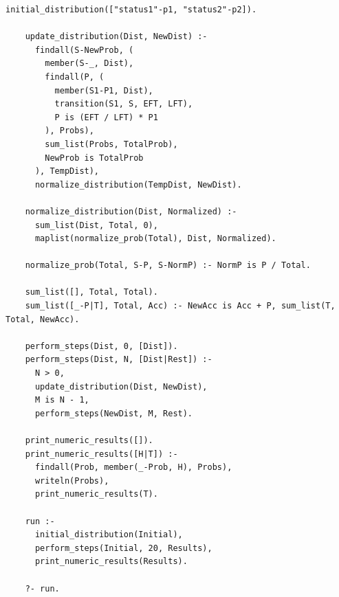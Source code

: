 \begin{lstlisting}[label=code:prog2, caption={Реализация построения вероятностного распределения}]
	initial_distribution(["status1"-p1, "status2"-p2]).
	
	update_distribution(Dist, NewDist) :-
	  findall(S-NewProb, (
	    member(S-_, Dist),
	    findall(P, (
	      member(S1-P1, Dist),
	      transition(S1, S, EFT, LFT),
	      P is (EFT / LFT) * P1
	    ), Probs),
	    sum_list(Probs, TotalProb),
	    NewProb is TotalProb
	  ), TempDist),
	  normalize_distribution(TempDist, NewDist).
	
	normalize_distribution(Dist, Normalized) :-
	  sum_list(Dist, Total, 0),
	  maplist(normalize_prob(Total), Dist, Normalized).
	
	normalize_prob(Total, S-P, S-NormP) :- NormP is P / Total.
	
	sum_list([], Total, Total).
	sum_list([_-P|T], Total, Acc) :- NewAcc is Acc + P, sum_list(T, Total, NewAcc).
	
	perform_steps(Dist, 0, [Dist]).
	perform_steps(Dist, N, [Dist|Rest]) :-
	  N > 0,
	  update_distribution(Dist, NewDist),
	  M is N - 1,
	  perform_steps(NewDist, M, Rest).
	
	print_numeric_results([]).
	print_numeric_results([H|T]) :-
	  findall(Prob, member(_-Prob, H), Probs),
	  writeln(Probs),
	  print_numeric_results(T).
	
	run :-
	  initial_distribution(Initial),
	  perform_steps(Initial, 20, Results),
	  print_numeric_results(Results).
	
	?- run.
\end{lstlisting}

\clearpage